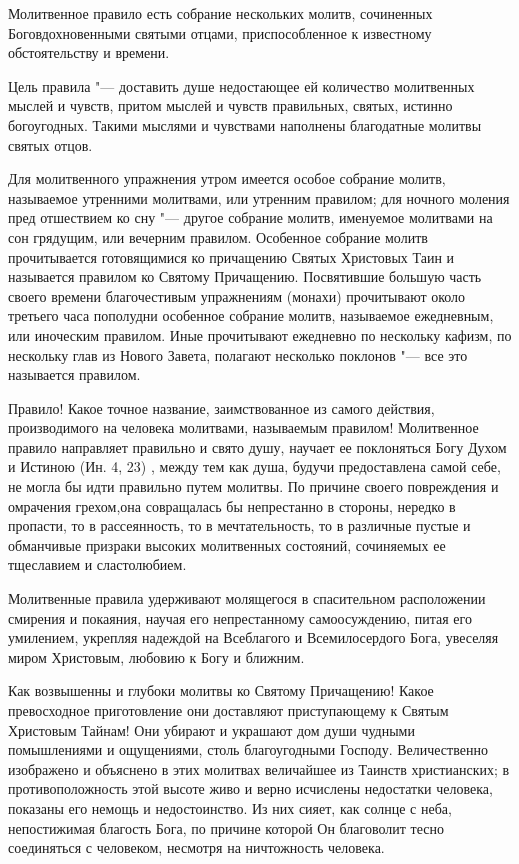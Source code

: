 \begin{mymulticols}
Молитвенное правило есть собрание нескольких молитв, сочиненных Боговдохновенными святыми отцами, приспособленное к известному обстоятельству и времени.

Цель правила "--- доставить душе недостающее ей количество молитвенных мыслей и чувств, притом мыслей и чувств правильных, святых, истинно богоугодных. Такими мыслями и чувствами наполнены благодатные молитвы святых отцов.

Для молитвенного упражнения утром имеется особое собрание молитв, называемое утренними молитвами, или утренним правилом; для ночного моления пред отшествием ко сну "--- другое собрание молитв, именуемое молитвами на сон грядущим, или вечерним правилом. Особенное собрание молитв прочитывается готовящимися ко причащению Святых Христовых Таин и называется правилом ко Святому Причащению. Посвятившие большую часть своего времени благочестивым упражнениям (монахи) прочитывают около третьего часа пополудни особенное собрание молитв, называемое ежедневным, или иноческим правилом. Иные прочитывают ежедневно по нескольку кафизм, по нескольку глав из Нового Завета, полагают несколько поклонов "--- все это называется правилом.

Правило! Какое точное название, заимствованное из самого действия, производимого на человека молитвами, называемым правилом! Молитвенное правило направляет правильно и свято душу, научает ее поклоняться Богу Духом и Истиною (Ин. 4, 23) , между тем как душа, будучи предоставлена самой себе, не могла бы идти правильно путем молитвы. По причине своего повреждения и омрачения грехом,она совращалась бы непрестанно в стороны, нередко в пропасти, то в рассеянность, то в мечтательность, то в различные пустые и обманчивые призраки высоких молитвенных состояний, сочиняемых ее тщеславием и сластолюбием.

Молитвенные правила удерживают молящегося в спасительном расположении смирения и покаяния, научая его непрестанному самоосуждению, питая его умилением, укрепляя надеждой на Всеблагого и Всемилосердого Бога, увеселяя миром Христовым, любовию к Богу и ближним.

Как возвышенны и глубоки молитвы ко Святому Причащению! Какое превосходное приготовление они доставляют приступающему к Святым Христовым Тайнам! Они убирают и украшают дом души чудными помышлениями и ощущениями, столь благоугодными Господу. Величественно изображено и объяснено в этих молитвах величайшее из Таинств христианских; в противоположность этой высоте живо и верно исчислены недостатки человека, показаны его немощь и недостоинство. Из них сияет, как солнце с неба, непостижимая благость Бога, по причине которой Он благоволит тесно соединяться с человеком, несмотря на ничтожность человека.


\end{mymulticols}
